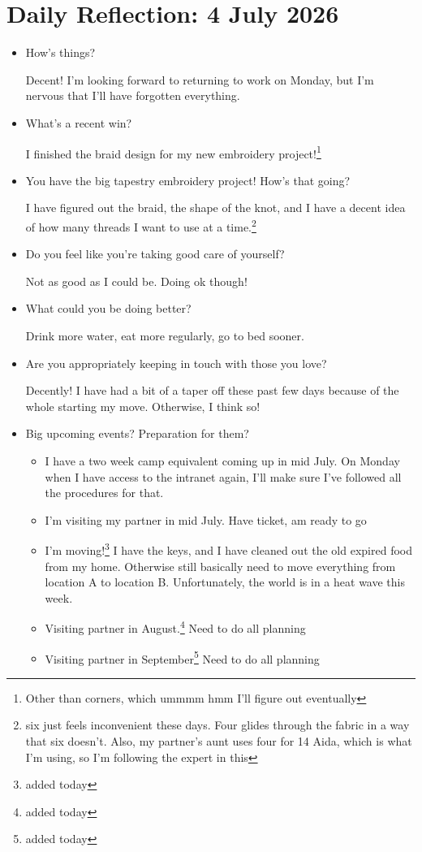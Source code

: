 \documentclass[12pt]{article}
\renewcommand{\,}{\textsuperscript{,}}
\begin{document}
\section{Daily Reflection: 4 July 2026}  
\begin{itemize}  
\item How's things?

Decent! I'm looking forward to returning to work on Monday, but I'm nervous that I'll have forgotten everything.

\item What's a recent win?

I finished the braid design for my new embroidery project!\footnote{Other than corners, which ummmm hmm I'll figure out eventually}

\item You have the big tapestry embroidery project! How's that going?

I have figured out the braid, the shape of the knot, and I have a decent idea of how many threads I want to use at a time.\footnote{six just feels inconvenient these days. Four glides through the fabric in a way that six doesn't. Also, my partner's aunt uses four for 14 Aida, which is what I'm using, so I'm following the expert in this}

\item Do you feel like you're taking good care of yourself?

Not as good as I could be. Doing ok though!

\item What could you be doing better?

Drink more water, eat more regularly, go to bed sooner.

\item Are you appropriately keeping in touch with those you love?

Decently! I have had a bit of a taper off these past few days because of the whole starting my move.  
Otherwise, I think so!

\item Big upcoming events? Preparation for them?

\begin{itemize}

\item I have a two week camp equivalent coming up in mid July. On Monday when I have access to the intranet again, I'll make sure I've followed all the procedures for that.  
\item I'm visiting my partner in mid July. Have ticket, am ready to go  
\item I'm moving!\footnote{added today} I have the keys, and I have cleaned out the old expired food from my home. Otherwise still basically need to move everything from location A to location B. Unfortunately, the world is in a heat wave this week.  
\item Visiting partner in August.\footnote{ added today } Need to do all planning  
\item Visiting partner in September\footnote{added today} Need to do all planning


\end{itemize}
\end{itemize}
\end{document}

